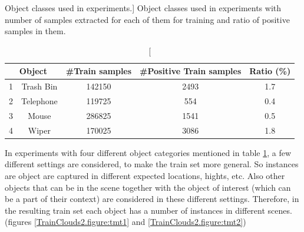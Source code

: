 \begin{table}
\centering
\caption
[Object classes used in experiments.]
{Object classes used in experiments with number of samples extracted for each of them for training and ratio of positive samples in them.}
\label{Objects.table}
\begin{tabular}{|c|c|c|c|c|}
\hline
\multicolumn{2}{|c|}{Object} & \#Train samples & \#Positive Train samples & Ratio (\%) \\
\hline
      1 & Trash Bin & 142150 & 2493 & 1.7 \\
\hline
      2 & Telephone   & 119725 & 554  & 0.4 \\
\hline
      3 & Mouse     & 286825 & 1541 & 0.5 \\
\hline
      4 & Wiper     & 170025 & 3086 & 1.8 \\
\hline

\end{tabular}
\end{table}


In experiments with four different object categories mentioned in table \ref{Objects.table}, a few different settings are considered, to make the train set more general. So instances are object are captured in different expected locations, hights, etc. Also other objects that can be in the scene together with the object of interest (which can be a part of their context) are considered in these different settings. Therefore, in the resulting train set each object has a number of instances in different scenes.
(figures \ref{TrainClouds2.figure:tmt1} and \ref{TrainClouds2.figure:tmt2})

